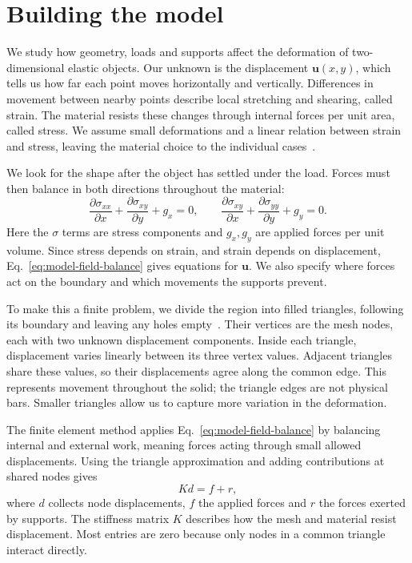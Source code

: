 \section{Building the model}
\label{sec:building-model}

We study how geometry, loads and supports affect the deformation of
two-dimensional elastic objects. Our unknown is the displacement
$\mathbf{u}(x,y)$, which tells us how far each point moves horizontally and
vertically. Differences in movement between nearby points describe local
stretching and shearing, called strain. The material resists these changes
through internal forces per unit area, called stress. We assume small
deformations and a linear relation between strain and stress, leaving the
material choice to the individual cases~\cite{logg-langtangen-elasticity}.

We look for the shape after the object has settled under the load. Forces
must then balance in both directions throughout the material:
\begin{equation}
 \frac{\partial\sigma_{xx}}{\partial x}
 +\frac{\partial\sigma_{xy}}{\partial y}+g_x=0,\qquad
 \frac{\partial\sigma_{xy}}{\partial x}
 +\frac{\partial\sigma_{yy}}{\partial y}+g_y=0.
 \label{eq:model-field-balance}
\end{equation}
Here the $\sigma$ terms are stress components and $g_x,g_y$ are applied
forces per unit volume. Since stress depends on strain, and strain depends
on displacement, Eq.~\eqref{eq:model-field-balance} gives equations for
$\mathbf{u}$. We also specify where forces act on the boundary and which
movements the supports prevent.

To make this a finite problem, we divide the region into filled triangles,
following its boundary and leaving any holes empty~\cite{shewchuk-triangle}.
Their vertices are the mesh nodes, each with two unknown displacement
components. Inside each triangle, displacement varies linearly between
its three vertex values. Adjacent triangles share these values, so their
displacements agree along the common edge. This represents movement
throughout the solid; the triangle edges are not physical bars. Smaller
triangles allow us to capture more variation in the deformation.

The finite element method applies Eq.~\eqref{eq:model-field-balance}
by balancing internal and external work, meaning forces acting through
small allowed displacements. Using the triangle approximation and adding
contributions at shared nodes gives
\begin{equation}
 Kd=f+r,
 \label{eq:model-full-balance}
\end{equation}
where $d$ collects node displacements, $f$ the applied forces and $r$ the
forces exerted by supports. The stiffness matrix $K$ describes how the
mesh and material resist displacement. Most entries are zero because
only nodes in a common triangle interact directly.

